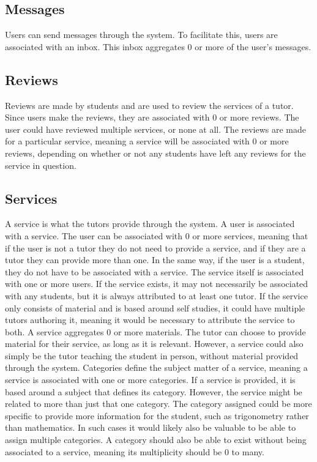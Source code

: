 \subsection{Messages}
Users can send messages through the system.
To facilitate this, users are associated with an inbox.
This inbox aggregates 0 or more of the user's messages.

\subsection{Reviews}
Reviews are made by students and are used to review the services of a tutor.
Since users make the reviews, they are associated with 0 or more reviews.
The user could have reviewed multiple services, or none at all.
The reviews are made for a particular service, meaning a service will be associated with 0 or more reviews, depending on whether or not any students have left any reviews for the service in question.

\subsection{Services}
A service is what the tutors provide through the system.
A user is associated with a service.
The user can be associated with 0 or more services, meaning that if the user is not a tutor they do not need to provide a service, and if they are a tutor they can provide more than one. 
In the same way, if the user is a student, they do not have to be associated with a service.
The service itself is associated with one or more users.
If the service exists, it may not necessarily be associated with any students, but it is always attributed to at least one tutor.
If the service only consists of material and is based around self studies, it could have multiple tutors authoring it, meaning it would be necessary to attribute the service to both.
A service aggregates 0 or more materials.
The tutor can choose to provide material for their service, as long as it is relevant.
However, a service could also simply be the tutor teaching the student in person, without material provided through the system.
Categories define the subject matter of a service, meaning a service is associated with one or more categories.
If a service is provided, it is based around a subject that defines its category.
However, the service might be related to more than just that one category.
The category assigned could be more specific to provide more information for the student, such as trigonometry rather than mathematics.
In such cases it would likely also be valuable to be able to assign multiple categories.
A category should also be able to exist without being associated to a service, meaning its multiplicity should be 0 to many.